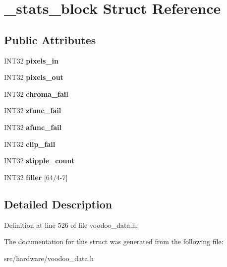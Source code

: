 \hypertarget{struct__stats__block}{\section{\-\_\-stats\-\_\-block Struct Reference}
\label{struct__stats__block}
}
\subsection*{Public Attributes}
\begin{DoxyCompactItemize}
\item 
\hypertarget{struct__stats__block_a537fba6ea181dca53e08f5ce00f00864}{I\-N\-T32 {\bfseries pixels\-\_\-in}}\label{struct__stats__block_a537fba6ea181dca53e08f5ce00f00864}

\item 
\hypertarget{struct__stats__block_adc9fb7b9c25ed8d1a59eacf9d42d3fc0}{I\-N\-T32 {\bfseries pixels\-\_\-out}}\label{struct__stats__block_adc9fb7b9c25ed8d1a59eacf9d42d3fc0}

\item 
\hypertarget{struct__stats__block_a9b32f2bbc8fa370a41e15a6481c3c559}{I\-N\-T32 {\bfseries chroma\-\_\-fail}}\label{struct__stats__block_a9b32f2bbc8fa370a41e15a6481c3c559}

\item 
\hypertarget{struct__stats__block_aa53075d8fedd98acb483ba40fd0822e8}{I\-N\-T32 {\bfseries zfunc\-\_\-fail}}\label{struct__stats__block_aa53075d8fedd98acb483ba40fd0822e8}

\item 
\hypertarget{struct__stats__block_a9c21d6e47b2d8d318e1389ac16eed0e6}{I\-N\-T32 {\bfseries afunc\-\_\-fail}}\label{struct__stats__block_a9c21d6e47b2d8d318e1389ac16eed0e6}

\item 
\hypertarget{struct__stats__block_a4c87f23e26b31ae127b108b01a8f8692}{I\-N\-T32 {\bfseries clip\-\_\-fail}}\label{struct__stats__block_a4c87f23e26b31ae127b108b01a8f8692}

\item 
\hypertarget{struct__stats__block_ab45e05cc6b83769613f283cea7939066}{I\-N\-T32 {\bfseries stipple\-\_\-count}}\label{struct__stats__block_ab45e05cc6b83769613f283cea7939066}

\item 
\hypertarget{struct__stats__block_ae3295406d1900245daaa3c1b9ab751ef}{I\-N\-T32 {\bfseries filler} \mbox{[}64/4-\/7\mbox{]}}\label{struct__stats__block_ae3295406d1900245daaa3c1b9ab751ef}

\end{DoxyCompactItemize}


\subsection{Detailed Description}


Definition at line 526 of file voodoo\-\_\-data.\-h.



The documentation for this struct was generated from the following file\-:\begin{DoxyCompactItemize}
\item 
src/hardware/voodoo\-\_\-data.\-h\end{DoxyCompactItemize}
